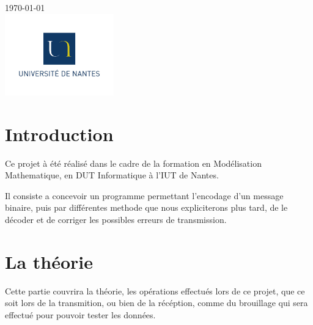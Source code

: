\begin{titlepage}

{\large \today}\\[2cm] %



\includegraphics[width=4.7cm]{logo.jpg}\\%


\vfill %

\end{titlepage}


\section{Introduction}

Ce projet à été réalisé dans le cadre de la formation en Modélisation Mathematique, en DUT Informatique à l'IUT de Nantes.

Il consiste a concevoir un programme permettant l'encodage d'un message binaire, puis par différentes methode que nous expliciterons plus tard, de le décoder et de corriger les possibles erreurs de transmission.



\section{La théorie}
\label{sec:theorie}

Cette partie couvrira la théorie, les opérations effectués lors de ce projet, que ce soit lors de la transmition, ou bien de la récéption, comme du brouillage qui sera effectué pour pouvoir tester les données.

